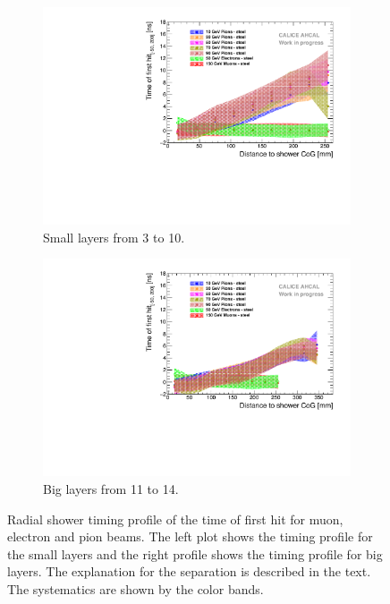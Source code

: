 \begin{figure}[htbp!]
	\begin{subfigure}[t]{0.5\textwidth}
		\centering
		\includegraphics[width=1\textwidth]{chap5/fig_AHCAL_timing/Pions/Timing_Radius_Comparison_ShortAsymRange_SSF.pdf}
		\caption{Small layers from 3 to 10.}\label{fig:Radius_Comparison_SSF}
	\end{subfigure}
	\hfill
	\begin{subfigure}[t]{0.5\textwidth}
		\centering
		\includegraphics[width=1\textwidth]{chap5/fig_AHCAL_timing/Pions/Timing_Radius_Comparison_ShortAsymRange_BL.pdf}
		\caption{Big layers from 11 to 14.}\label{fig:Radius_Comparison_BL}
	\end{subfigure}
	\caption{Radial shower timing profile of the time of first hit for muon, electron and pion beams. The left plot shows the timing profile for the small layers and the right profile shows the timing profile for big layers. The explanation for the separation is described in the text. The systematics are shown by the color bands.}
	\label{fig:RadialTiming}
\end{figure}

